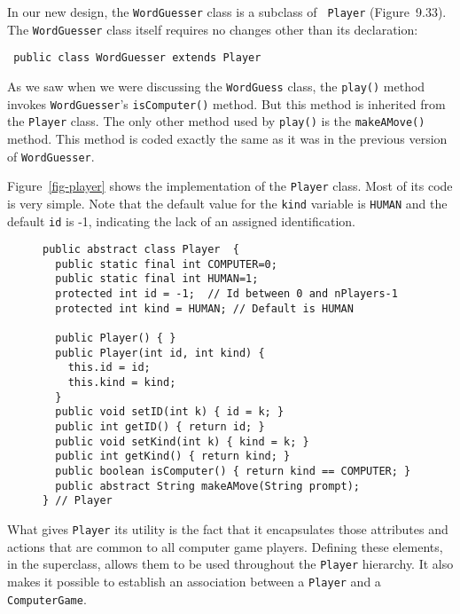 In our new design, the {\tt WordGuesser} class is a subclass of {\tt
Player} (Figure~9.33).  The {\tt WordGuesser} class itself requires
no changes other than its declaration:

\begin{jjjlisting}
\begin{lstlisting}
 public class WordGuesser extends Player
\end{lstlisting}
\end{jjjlisting}

\noindent As we saw when we were discussing the {\tt WordGuess} class, the
{\tt play()} method invokes {\tt WordGuesser}'s {\tt isComputer()}
method. But this method is inherited from the {\tt Player} class.  The
only other method used by {\tt play()} is the {\tt makeAMove()}
method. This method is coded exactly the same as it was in the
previous version of {\tt WordGuesser}.

Figure~\ref{fig-player} shows the implementation of the {\tt Player}
class. Most of its code is very simple. Note that the default value
for the {\tt kind} variable is {\tt HUMAN} and the default {\tt id} is
-1, indicating the lack of an assigned identification.

\begin{figure}[h!]
\jjjprogstart
\begin{jjjlisting}
\begin{lstlisting}
public abstract class Player  {   
  public static final int COMPUTER=0;
  public static final int HUMAN=1;
  protected int id = -1;  // Id between 0 and nPlayers-1
  protected int kind = HUMAN; // Default is HUMAN

  public Player() { }
  public Player(int id, int kind) {
    this.id = id;
    this.kind = kind;
  }
  public void setID(int k) { id = k; }
  public int getID() { return id; }
  public void setKind(int k) { kind = k; }
  public int getKind() { return kind; }
  public boolean isComputer() { return kind == COMPUTER; }
  public abstract String makeAMove(String prompt); 
} // Player
\end{lstlisting}
\end{jjjlisting}
\end{figure}

What gives {\tt Player} its utility is the fact that it encapsulates
those attributes and actions that are common to all computer game
players. Defining these elements, in the superclass, allows them to
be used throughout the {\tt Player} hierarchy.  It also makes it
possible to establish an association between a {\tt Player} and a {\tt
ComputerGame}.

